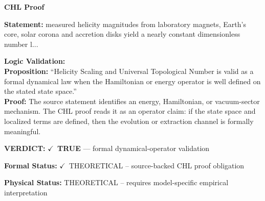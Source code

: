 \vspace{0.45em}
\noindent\textbf{CHL Proof}\par
\textbf{Statement:} measured helicity magnitudes from laboratory magnets, Earth's core, solar corona and
accretion disks yield a nearly constant dimensionless number l...

\textbf{Logic Validation:}\\
\textbf{Proposition:} ``Helicity Scaling and Universal Topological Number is valid as a formal dynamical law
when the Hamiltonian or energy operator is well defined on the stated state space.''\\
\textbf{Proof:} The source statement identifies an energy, Hamiltonian, or vacuum-sector mechanism. The
CHL proof reads it as an operator claim: if the state space and localized terms are
defined, then the evolution or extraction channel is formally meaningful.

\textbf{VERDICT:} \ensuremath{\checkmark}\ \textbf{TRUE} --- formal dynamical-operator validation

\textbf{Formal Status:} \ensuremath{\checkmark}\ THEORETICAL -- source-backed CHL proof obligation

\textbf{Physical Status:} THEORETICAL -- requires model-specific empirical interpretation
\par\vspace{0.45em}
\par
\ifTZPDarkEdition
{}
\fi
\endgroup
\endgroup
